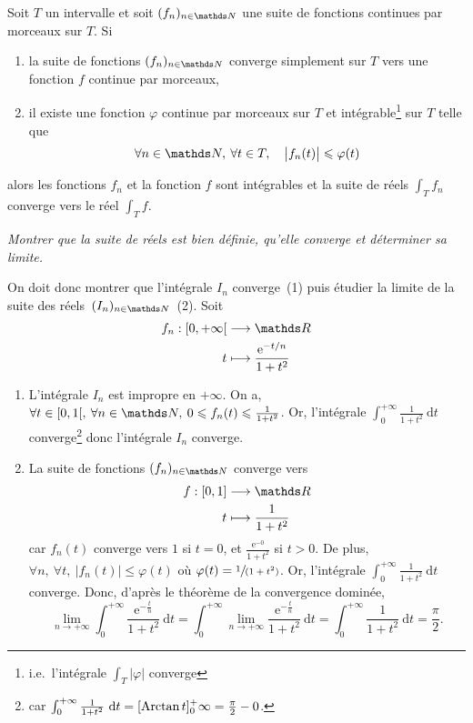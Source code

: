 \begin{thm}
	Soit $T$\/ un intervalle et soit $(f_n)_{n\in\N}$\/ une suite de fonctions continues par morceaux sur $T$.
	Si
	\begin{enumerate}
		\item la suite de fonctions $(f_n)_{n\in\N}$\/ converge simplement sur $T$\/ vers une fonction $f$\/ continue par morceaux,
		\item il existe une fonction $\varphi$\/ continue par morceaux sur $T$\/ et intégrable\footnote{i.e.\ l'intégrale $\int_T|\varphi|$\/ converge} sur $T$\/ telle que \[
				\forall n \in \N,\:\forall t \in T,\quad\big|f_n(t)\big| \le \varphi(t)
			\]
	\end{enumerate}
	alors les fonctions $f_n$\/ et la fonction $f$\/ sont intégrables et la suite de réels $\int_{T} f_n$\/ converge vers le réel $\int_T f$.
\end{thm}

\begin{exo}
	{\slshape Montrer que la suite de réels  est bien définie, qu'elle converge et déterminer sa limite.}

	On doit donc montrer que l'intégrale $I_n$\/ converge~(1) puis étudier la limite de la suite des réels~$(I_n)_{n\in\N}$\/~(2). Soit \begin{align*}
		f_n: {[0,+\infty[} &\longrightarrow \R \\
		t &\longmapsto \frac{\mathrm{e}^{-t/n}}{1+t^2}
	\end{align*}

	\begin{enumerate}
		\item L'intégrale $I_n$\/ est impropre en $+\infty$. On a, $\forall t \in [0,1[,\: \forall n \in \N,\: 0 \le f_n(t) \le \frac{1}{1+t^2}$. Or, l'intégrale $\int_{0}^{+\infty} \frac{1}{1+t^2}~\mathrm{d}t$\/ converge\footnote{car $\int_{0}^{+\infty} \frac{1}{1+t^2}~\mathrm{d}t = [\operatorname{Arctan} t]_0^+\infty = \frac{\pi}{2} - 0$.} donc l'intégrale $I_n$\/ converge.
		\item La suite de fonctions $(f_n)_{n\in\N}$\/ converge vers  \begin{align*}
			f: [0,1] &\longrightarrow \R \\
			t &\longmapsto \frac{1}{1+t^2}
		\end{align*} car $f_n(t)$\/ converge vers $1$\/ si $t = 0$, et $\frac{\mathrm{e}^{-0}}{1+t^2}$\/ si $t > 0$. De plus, $\forall n,\:\forall t,\:|f_n(t)| \le \varphi(t)$\/ où $\varphi(t) = \sfrac{1}{(1+t^2)}$. Or, l'intégrale $\int_{0}^{+\infty} \frac{1}{1+t^2}~\mathrm{d}t$\/ converge. Donc, d'après le théorème de la convergence dominée, \[
			\lim_{n\to +\infty} \int_{0}^{+\infty} \frac{\mathrm{e}^{-\frac{t}{n}}}{1+t^2}~\mathrm{d}t = \int_{0}^{+\infty} \lim_{n\to +\infty} \frac{\mathrm{e}^{-\frac{t}{n}}}{1+t^2}~\mathrm{d}t = \int_{0}^{+\infty} \frac{1}{1+t^2}~\mathrm{d}t = \frac{\pi}{2}
		.\]
	\end{enumerate}
\end{exo}

